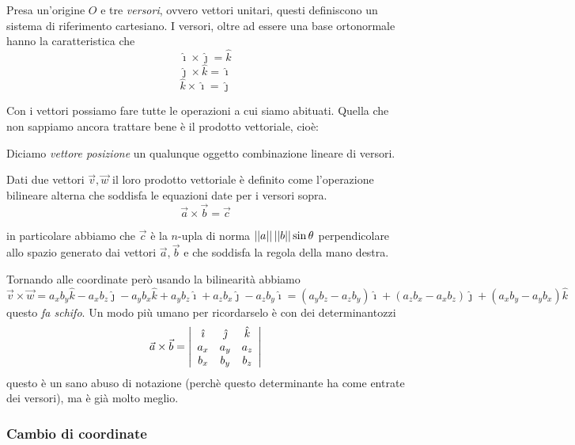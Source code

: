 \documentclass[11pt]{scrartcl}
\newcommand{\ihat}{\hat{\imath}}
\newcommand{\jhat}{\hat{\jmath}}
\newcommand{\khat}{\hat{k}}
\begin{document}
	\begin{definition}
		Presa un'origine $O$ e tre \textit{versori}, ovvero vettori unitari, questi definiscono un sistema di riferimento cartesiano. I versori, oltre ad essere una base ortonormale hanno la caratteristica che 
		$$\ihat \times \jhat = \khat$$
		$$\jhat \times \khat = \ihat$$
		$$\khat \times \ihat = \jhat$$
	\end{definition}
	Con i vettori possiamo fare tutte le operazioni a cui siamo abituati. Quella che non sappiamo ancora trattare bene è il prodotto vettoriale, cioè:
	\begin{definition}
		Diciamo \textit{vettore posizione} un qualunque oggetto combinazione lineare di versori.
	\end{definition}
	\begin{definition}
		Dati due vettori $\vec{v},\vec{w}$ il loro prodotto vettoriale è definito come l'operazione bilineare alterna che soddisfa le equazioni date per i versori sopra.
		$$\vec{a}\times \vec{b}=\vec{c}$$
		 
		in particolare abbiamo che $\vec{c}$ è la $n$-upla di norma $\left\lvert \left\lvert a \right\rvert \right\rvert\left\lvert \left\lvert b \right\rvert \right\rvert\sin\theta$ perpendicolare allo spazio generato dai vettori $\vec{a},\vec{b}$ e che soddisfa la regola della mano destra.
	\end{definition}
	Tornando alle coordinate però usando la bilinearità abbiamo
	$$\vec{v}\times \vec{w}=a_xb_y\khat - a_x b_z \jhat - a_yb_x \khat +a_yb_z \ihat +a_zb_x \jhat -a_z b_y \ihat =(a_yb_z-a_zb_y)\ihat + (a_zb_x-a_xb_z)\jhat + (a_xb_y -a_yb_x)\khat$$
	questo \textit{fa schifo}. Un modo più umano per ricordarselo è con dei determinantozzi
	$$\vec{a}\times \vec{b}=
	\abs{
		\begin{array}{ccc}
			\ihat & \jhat & \khat \\
			a_x & a_y & a_z \\
			b_x & b_y & b_z
		\end{array}
	}
	$$ 
	questo è un sano abuso di notazione (perchè questo determinante ha come entrate dei versori), ma è già molto meglio.
	
	\subsubsection{Cambio di coordinate}
	
\end{document}

